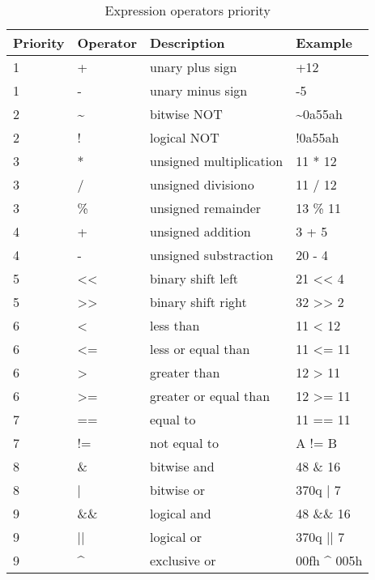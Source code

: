     \begin{table}[h!]
        \centering{}
        \mysmallfont{}

        \begin{tabular}{|l|l|l|l|}
            \hline
            Priority & Operator & Description             & Example         \\\hline
            1        & +        & unary plus sign         & +12             \\\hline
            1        & -        & unary minus sign        & -5              \\\hline
            2        & \~{}     & bitwise NOT             & \~{}0a55ah      \\\hline
            2        & !        & logical NOT             & !0a55ah         \\\hline
            3        & *        & unsigned multiplication & 11 * 12         \\\hline
            3        & /        & unsigned divisiono      & 11 / 12         \\\hline
            3        & \%       & unsigned remainder      & 13 \% 11        \\\hline
            4        & +        & unsigned addition       & 3 + 5           \\\hline
            4        & -        & unsigned substraction   & 20 - 4          \\\hline
            5        & <{}<     & binary shift left       & 21 <{}< 4       \\\hline
            5        & >{}>     & binary shift right      & 32 >{}> 2       \\\hline
            6        & <        & less than               & 11 < 12         \\\hline
            6        & <=       & less or equal than      & 11 <= 11        \\\hline
            6        &  >       & greater than            & 12 > 11         \\\hline
            6        & >=       & greater or equal than   & 12 >= 11        \\\hline
            7        & ==       & equal to                & 11 == 11        \\\hline
            7        & !=       & not equal to            &  A != B         \\\hline
            8        & \&       & bitwise and             & 48 \& 16        \\\hline
            8        & |        & bitwise or              & 370q | 7        \\\hline
            9        & \&\&     & logical and             & 48 \&\& 16      \\\hline
            9        & ||       & logical or              & 370q || 7       \\\hline
            9        & \^{}     & exclusive or            & 00fh \^{} 005h  \\\hline
        \end{tabular}

        \caption{Expression operators priority}
    \end{table}

